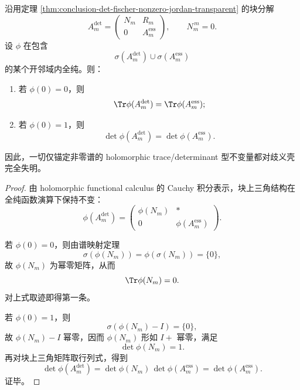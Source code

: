 \begin{theorem}\label{thm:conclusion-ambiguity-shell-holomorphic-nonzero-functional-blindness}
沿用定理 \ref{thm:conclusion-det-fischer-nonzero-jordan-transparent} 的块分解
\[
A_m^{\mathrm{det}}
=
\begin{pmatrix}
N_m & R_m\\
0 & A_m^{\mathrm{ess}}
\end{pmatrix},
\qquad
N_m^{\,m}=0.
\]
设 \(\phi\) 在包含
\[
\sigma(A_m^{\mathrm{det}})\cup \sigma(A_m^{\mathrm{ess}})
\]
的某个开邻域内全纯。则：
\begin{enumerate}
  \item 若 \(\phi(0)=0\)，则
  \[
  \Tr\phi(A_m^{\mathrm{det}})
  =
  \Tr\phi(A_m^{\mathrm{ess}});
  \]
  \item 若 \(\phi(0)=1\)，则
  \[
  \det\phi(A_m^{\mathrm{det}})
  =
  \det\phi(A_m^{\mathrm{ess}}).
  \]
\end{enumerate}
因此，一切仅锚定非零谱的 holomorphic trace/determinant 型不变量都对歧义壳完全失明。
\end{theorem}
\begin{proof}
由 holomorphic functional calculus 的 Cauchy 积分表示，块上三角结构在全纯函数演算下保持不变：
\[
\phi(A_m^{\mathrm{det}})
=
\begin{pmatrix}
\phi(N_m) & *\\
0 & \phi(A_m^{\mathrm{ess}})
\end{pmatrix}.
\]

若 \(\phi(0)=0\)，则由谱映射定理
\[
\sigma(\phi(N_m))=\phi(\sigma(N_m))=\{0\},
\]
故 \(\phi(N_m)\) 为幂零矩阵，从而
\[
\Tr\phi(N_m)=0.
\]
对上式取迹即得第一条。

若 \(\phi(0)=1\)，则
\[
\sigma(\phi(N_m)-I)=\{0\},
\]
故 \(\phi(N_m)-I\) 幂零，因而 \(\phi(N_m)\) 形如 \(I+\) 幂零，满足
\[
\det\phi(N_m)=1.
\]
再对块上三角矩阵取行列式，得到
\[
\det\phi(A_m^{\mathrm{det}})
=
\det\phi(N_m)\,\det\phi(A_m^{\mathrm{ess}})
=
\det\phi(A_m^{\mathrm{ess}}).
\]
证毕。
\end{proof}

